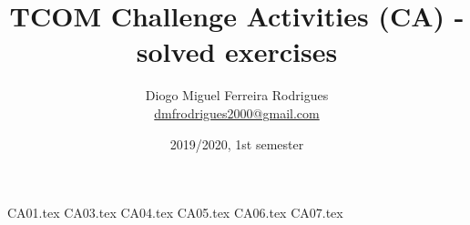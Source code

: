 \documentclass{tcom}
\title{TCOM Challenge Activities (CA) - solved exercises}
\author{Diogo Miguel Ferreira Rodrigues \\ \href{mailto:dmfrodrigues2000@gmail.com}{dmfrodrigues2000@gmail.com}}
\date{2019/2020, 1st semester}
\begin{document}
\begingroup
	\maketitle
	\let\clearpage\relax
	\setcounter{tocdepth}{2}
	\tableofcontents
\endgroup
{CA01.tex}
{CA03.tex}
{CA04.tex}
{CA05.tex}
{CA06.tex}
{CA07.tex}
\end{document}
